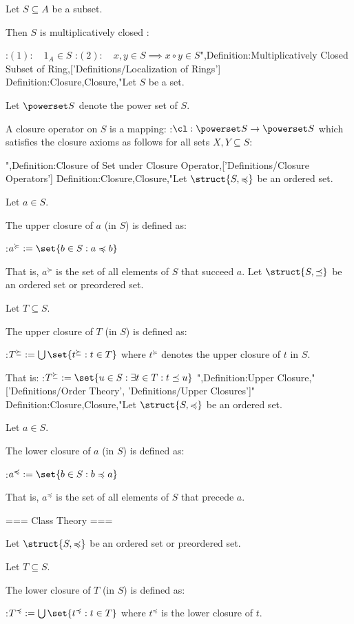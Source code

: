 Let $S \subseteq A$ be a subset.


Then $S$ is multiplicatively closed :

:$(1): \quad 1_A \in S$
:$(2): \quad x, y \in S \implies x \circ y \in S$",Definition:Multiplicatively Closed Subset of Ring,['Definitions/Localization of Rings']
Definition:Closure,Closure,"Let $S$ be a set.

Let $\powerset S$ denote the power set of $S$.


A closure operator on $S$ is a mapping:
:$\cl: \powerset S \to \powerset S$
which satisfies the closure axioms as follows for all sets $X, Y \subseteq S$:

",Definition:Closure of Set under Closure Operator,['Definitions/Closure Operators']
Definition:Closure,Closure,"Let $\struct {S, \preccurlyeq}$ be an ordered set.

Let $a \in S$.


The upper closure of $a$ (in $S$) is defined as:

:$a^\succcurlyeq := \set {b \in S: a \preccurlyeq b}$


That is, $a^\succcurlyeq$ is the set of all elements of $S$ that succeed $a$.
Let $\struct {S, \preceq}$ be an ordered set or preordered set.

Let $T \subseteq S$.


The upper closure of $T$ (in $S$) is defined as:

:$T^\succeq := \bigcup \set {t^\succeq: t \in T}$
where $t^\succeq$ denotes the upper closure of $t$ in $S$.

That is:
:$T^\succeq := \set {u \in S: \exists t \in T: t \preceq u}$
",Definition:Upper Closure,"['Definitions/Order Theory', 'Definitions/Upper Closures']"
Definition:Closure,Closure,"Let $\struct {S, \preccurlyeq}$ be an ordered set.

Let $a \in S$.


The lower closure of $a$ (in $S$) is defined as:

:$a^\preccurlyeq := \set {b \in S: b \preccurlyeq a}$


That is, $a^\preccurlyeq$ is the set of all elements of $S$ that precede $a$.


=== Class Theory ===


Let $\struct {S, \preccurlyeq}$ be an ordered set or preordered set.

Let $T \subseteq S$.


The lower closure of $T$ (in $S$) is defined as:

:$T^\preccurlyeq := \bigcup \set {t^\preccurlyeq: t \in T}$
where $t^\preccurlyeq$ is the lower closure of $t$.

